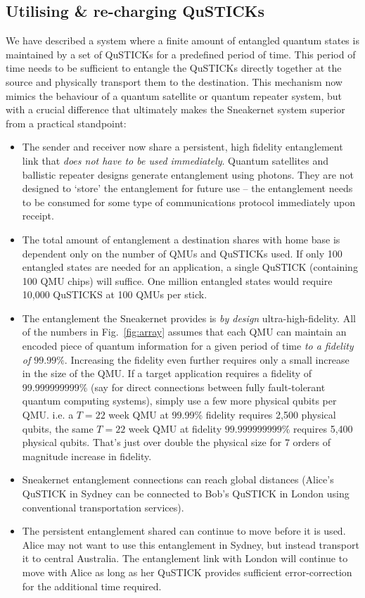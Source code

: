 \documentclass[twocolumn, aps, rmp, amsmath, amssymb, nofootinbib, superscriptaddress, longbibliography, floatfix, table-of-contents, eqsecnum]{revtex4-2}
\begin{document}
\subsection{Utilising \& re-charging QuSTICKs}

We have described a system where a finite amount of entangled quantum states is maintained by a set of QuSTICKs for a predefined period of time. This period of time needs to be sufficient to entangle the QuSTICKs directly together at the source and physically transport them to the destination. This mechanism now mimics the behaviour of a quantum satellite or quantum repeater system, but with a crucial difference that ultimately makes the Sneakernet system superior from a practical standpoint:
\begin{itemize}
\item The sender and receiver now share a persistent, high fidelity entanglement link that \textit{does not have to be used immediately}. Quantum satellites and ballistic repeater designs generate entanglement using photons. They are not designed to `store' the entanglement for future use -- the entanglement needs to be consumed for some type of communications protocol immediately upon receipt.
\item The total amount of entanglement a destination shares with home base is dependent only on the number of QMUs and QuSTICKs used. If only 100 entangled states are needed for an application, a single QuSTICK (containing 100 QMU chips) will suffice. One million entangled states would require 10,000 QuSTICKS at 100 QMUs per stick. 
\item The entanglement the Sneakernet provides is \textit{by design} ultra-high-fidelity. All of the numbers in Fig.~\ref{fig:array} assumes that each QMU can maintain an encoded piece of quantum information for a given period of time \textit{to a fidelity of $99.99\%$}. Increasing the fidelity even further requires only a small increase in the size of the QMU. If a target application requires a fidelity of 99.999999999\% (say for direct connections between fully fault-tolerant quantum computing systems), simply use a few more physical qubits per QMU. i.e. a $T= 22$ week QMU at 99.99\% fidelity requires 2,500 physical qubits, the same $T=22$ week QMU at fidelity $99.999999999\%$ requires 5,400 physical qubits. That's just over double the physical size for 7 orders of magnitude increase in fidelity.
\item Sneakernet entanglement connections can reach global distances (Alice's QuSTICK in Sydney can be connected to Bob's QuSTICK in London using conventional transportation services).
\item The persistent entanglement shared can continue to move before it is used. Alice may not want to use this entanglement in Sydney, but instead transport it to central Australia. The entanglement link with London will continue to move with Alice as long as her QuSTICK provides sufficient error-correction for the additional time required.
\end{itemize}
\end{document}

